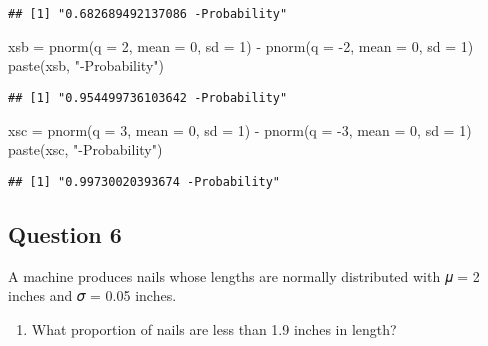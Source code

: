 \documentclass[
]{article}
\newenvironment{Shaded}{\begin{snugshade}}{\end{snugshade}}
\newcommand{\AttributeTok}[1]{\textcolor[rgb]{0.77,0.63,0.00}{#1}}
\newcommand{\DecValTok}[1]{\textcolor[rgb]{0.00,0.00,0.81}{#1}}
\newcommand{\FunctionTok}[1]{\textcolor[rgb]{0.00,0.00,0.00}{#1}}
\newcommand{\NormalTok}[1]{#1}
\newcommand{\OtherTok}[1]{\textcolor[rgb]{0.56,0.35,0.01}{#1}}
\newcommand{\SpecialCharTok}[1]{\textcolor[rgb]{0.00,0.00,0.00}{#1}}
\newcommand{\StringTok}[1]{\textcolor[rgb]{0.31,0.60,0.02}{#1}}
\providecommand{\tightlist}{%
  \setlength{\itemsep}{0pt}\setlength{\parskip}{0pt}}
\begin{document}
\begin{verbatim}
## [1] "0.682689492137086 -Probability"
\end{verbatim}

\begin{Shaded}
\begin{Highlighting}[]
\NormalTok{xsb }\OtherTok{=} \FunctionTok{pnorm}\NormalTok{(}\AttributeTok{q =} \DecValTok{2}\NormalTok{, }\AttributeTok{mean =} \DecValTok{0}\NormalTok{, }\AttributeTok{sd =} \DecValTok{1}\NormalTok{) }\SpecialCharTok{{-}} \FunctionTok{pnorm}\NormalTok{(}\AttributeTok{q =} \SpecialCharTok{{-}}\DecValTok{2}\NormalTok{, }\AttributeTok{mean =} \DecValTok{0}\NormalTok{, }\AttributeTok{sd =} \DecValTok{1}\NormalTok{) }
\FunctionTok{paste}\NormalTok{(xsb, }\StringTok{"{-}Probability"}\NormalTok{)  }
\end{Highlighting}
\end{Shaded}

\begin{verbatim}
## [1] "0.954499736103642 -Probability"
\end{verbatim}

\begin{Shaded}
\begin{Highlighting}[]
\NormalTok{xsc }\OtherTok{=} \FunctionTok{pnorm}\NormalTok{(}\AttributeTok{q =} \DecValTok{3}\NormalTok{, }\AttributeTok{mean =} \DecValTok{0}\NormalTok{, }\AttributeTok{sd =} \DecValTok{1}\NormalTok{) }\SpecialCharTok{{-}} \FunctionTok{pnorm}\NormalTok{(}\AttributeTok{q =} \SpecialCharTok{{-}}\DecValTok{3}\NormalTok{, }\AttributeTok{mean =} \DecValTok{0}\NormalTok{, }\AttributeTok{sd =} \DecValTok{1}\NormalTok{) }
\FunctionTok{paste}\NormalTok{(xsc, }\StringTok{"{-}Probability"}\NormalTok{)  }
\end{Highlighting}
\end{Shaded}

\begin{verbatim}
## [1] "0.99730020393674 -Probability"
\end{verbatim}

\hypertarget{question-6}{%
\subsection{Question 6}\label{question-6}}

A machine produces nails whose lengths are normally distributed with 𝜇 =
2 inches and 𝜎 = 0.05 inches.

\begin{enumerate}
\def\labelenumi{\alph{enumi}.}
\tightlist
\item
  What proportion of nails are less than 1.9 inches in length?
\end{enumerate}
\end{document}
